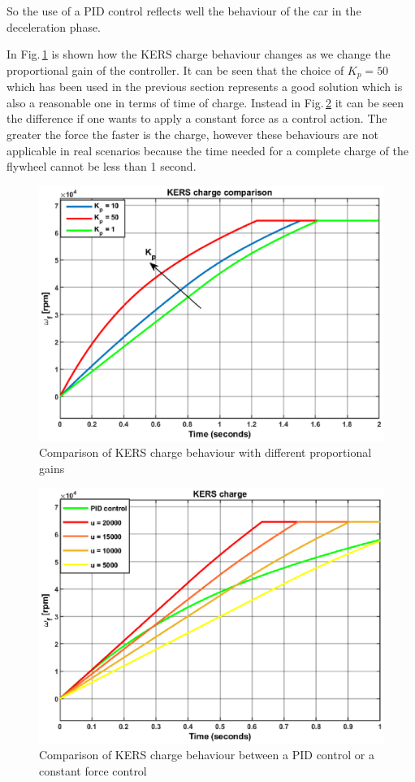 \documentclass[11pt]{article}
\begin{document}
So the use of a PID control reflects well the behaviour of the car in the deceleration phase. 

In Fig.\,\ref{fig: Comparison_KERS_Charge_PID_Prop} is shown how the KERS charge behaviour changes as we change the proportional gain of the controller. It can be seen that the choice of $K_p = 50$ which has been used in the previous section represents a good solution which is also a reasonable one in terms of time of charge. Instead in Fig.\,\ref{fig: Comparison_KERS_Charge_Control} it can be seen the difference if one wants to apply a constant force as a control action. The greater the force the faster is the charge, however these behaviours are not applicable in real scenarios because the time needed for a complete charge of the flywheel cannot be less than 1 second.

\begin{figure}[H]
\centering
\includegraphics[width=.6\textwidth]{Images/Results_Dynamics/Charge_comparison/kers_charge_comp_PropGain.eps}
\caption{Comparison of KERS charge behaviour with different proportional gains}
\label{fig: Comparison_KERS_Charge_PID_Prop}
\end{figure}

\begin{figure}[H]
\centering
\includegraphics[width=.6\textwidth]{Images/Results_Dynamics/Charge_comparison/kers_charge_constantforce.eps}
\caption{Comparison of KERS charge behaviour between a PID control or a constant force control }
\label{fig: Comparison_KERS_Charge_Control}
\end{figure}
\end{document}

